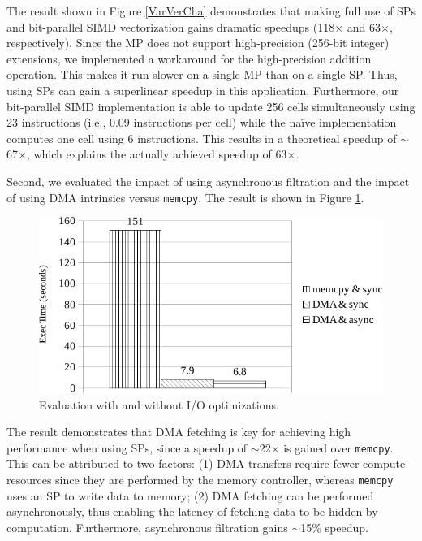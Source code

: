 The result shown in Figure \ref{VarVerCha} demonstrates that making
full use of SPs and bit-parallel SIMD vectorization gains dramatic
speedups (118$\times$ and 63$\times$, respectively). Since the MP does
not support high-precision (256-bit integer) extensions, we
implemented a workaround for the high-precision addition
operation. This makes it run slower on a single MP than on a single
SP. Thus, using SPs can gain a superlinear speedup in this
application. Furthermore, our bit-parallel SIMD implementation is able
to update 256 cells simultaneously using 23 instructions (i.e., 0.09
instructions per cell) while the na\"ive implementation computes one
cell using 6 instructions. This results in a theoretical speedup of
$\sim$67$\times$, which explains the actually achieved speedup of
63$\times$.

Second, we evaluated the impact of using asynchronous filtration and
the impact of using DMA intrinsics versus \texttt{memcpy}. The result
is shown in Figure \ref{VarOptCha}.

\begin{figure}[!htb]
  \begin{center}
    \includegraphics[width=1\linewidth]{figures/VarOptCha}
    \caption{Evaluation with and without I/O optimizations.}
    \label{VarOptCha}
  \end{center}
\end{figure}

The result demonstrates that DMA fetching is key for achieving high
performance when using SPs, since a speedup of $\sim$22$\times$ is
gained over \texttt{memcpy}. This can be attributed to two factors:
(1) DMA transfers require fewer compute resources since they are
performed by the memory controller, whereas \texttt{memcpy} uses an SP
to write data to memory; (2) DMA fetching can be performed
asynchronously, thus enabling the latency of fetching data to be
hidden by computation. Furthermore, asynchronous filtration gains
$\sim$15\% speedup.

